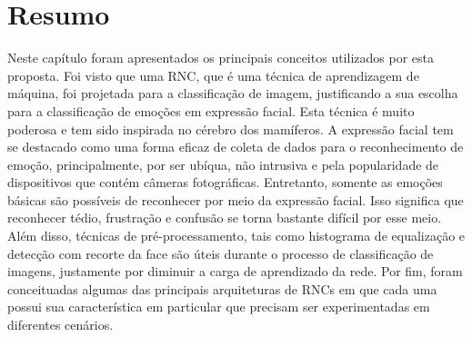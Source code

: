 
\section{Resumo}\label{sec:considf}
Neste capítulo foram apresentados os principais conceitos utilizados por esta proposta. Foi visto que uma RNC, que é uma técnica de aprendizagem de máquina, foi projetada para a classificação de imagem, justificando a sua escolha para a classificação de emoções em expressão facial. Esta técnica é muito poderosa e tem sido inspirada no cérebro dos mamíferos. A expressão facial tem se destacado como uma forma eficaz de coleta de dados para o reconhecimento de emoção, principalmente, por ser ubíqua, não intrusiva e pela popularidade de dispositivos que contém câmeras fotográficas. Entretanto, somente as emoções básicas são possíveis de reconhecer por meio da expressão facial. Isso significa que reconhecer tédio, frustração e confusão se torna bastante difícil por esse meio. Além disso, técnicas de pré-processamento, tais como histograma de equalização e detecção com recorte da face são úteis durante o processo de classificação de imagens, justamente por diminuir a carga de aprendizado da rede. Por fim, foram conceituadas algumas das principais arquiteturas de RNCs em que cada uma possui sua característica em particular que precisam ser experimentadas em diferentes cenários.  
